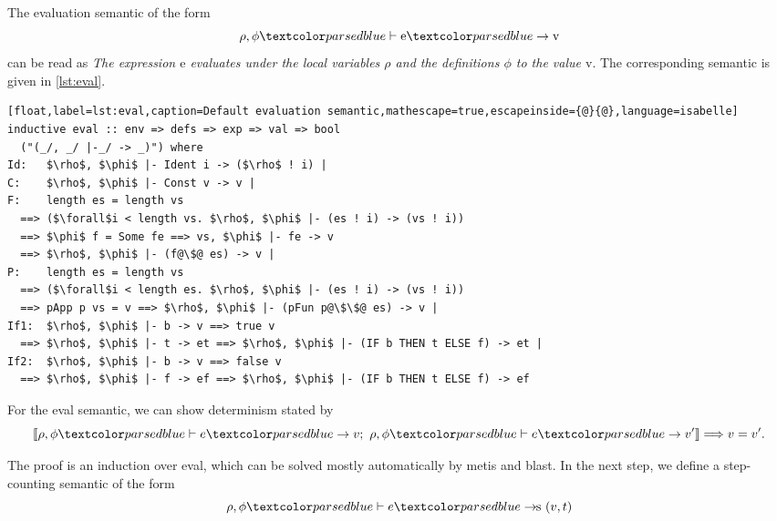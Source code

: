 The evaluation semantic of the form
\begin{equation*}
  \rho, \phi \hvdash \text{e} \hrightarrow \text{v}
\end{equation*}
can be read as \textit{The expression $\text{e}$ evaluates under the local variables $\rho$ and the definitions $\phi$ to the value $\text{v}$}. The corresponding semantic is given in \autoref{lst:eval}.
\begin{lstlisting}[float,label=lst:eval,caption=Default evaluation semantic,mathescape=true,escapeinside={@}{@},language=isabelle]
inductive eval :: env => defs => exp => val => bool
  ("(_/, _/ |-_/ -> _)") where
Id:   $\rho$, $\phi$ |- Ident i -> ($\rho$ ! i) |
C:    $\rho$, $\phi$ |- Const v -> v |
F:    length es = length vs
  ==> ($\forall$i < length vs. $\rho$, $\phi$ |- (es ! i) -> (vs ! i))
  ==> $\phi$ f = Some fe ==> vs, $\phi$ |- fe -> v
  ==> $\rho$, $\phi$ |- (f@\$@ es) -> v |
P:    length es = length vs
  ==> ($\forall$i < length es. $\rho$, $\phi$ |- (es ! i) -> (vs ! i))
  ==> pApp p vs = v ==> $\rho$, $\phi$ |- (pFun p@\$\$@ es) -> v |
If1:  $\rho$, $\phi$ |- b -> v ==> true v
  ==> $\rho$, $\phi$ |- t -> et ==> $\rho$, $\phi$ |- (IF b THEN t ELSE f) -> et |
If2:  $\rho$, $\phi$ |- b -> v ==> false v
  ==> $\rho$, $\phi$ |- f -> ef ==> $\rho$, $\phi$ |- (IF b THEN t ELSE f) -> ef
\end{lstlisting}

For the eval semantic, we can show determinism stated by
\begin{equation*}
 \llbracket \rho, \phi \hvdash e \hrightarrow v; \text{ } \rho, \phi \hvdash e \hrightarrow v' \rrbracket \Longrightarrow v = v'.
\end{equation*}

The proof is an induction over eval, which can be solved mostly automatically by metis and blast.
In the next step, we define a step-counting semantic of the form
\begin{equation*}
  \rho, \phi \hvdash e \hrightarrows (v,t)
\end{equation*}

